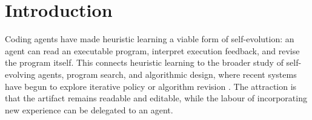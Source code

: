 %

\section{Introduction}
\label{sec:introduction}

Coding agents have made heuristic learning a viable form of self-evolution: an agent
can read an executable program, interpret execution feedback, and revise the program
itself. This connects heuristic learning to the broader study of self-evolving agents,
program search, and algorithmic design, where recent systems have begun to explore
iterative policy or algorithm revision \citep{garnier2026heuristic,evopolicygym2026,
ai4aibench2026}. The attraction is that the artifact remains readable and editable,
while the labour of incorporating new experience can be delegated to an agent.

